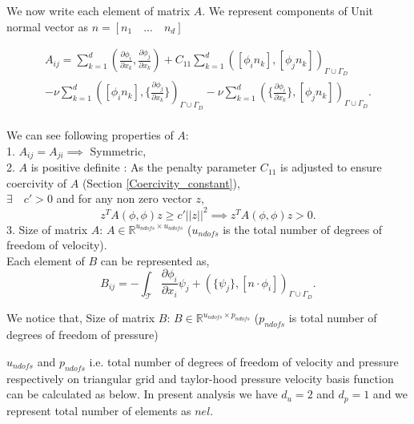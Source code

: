 \documentclass[a4paper,twoside,openright]{book}
\begin{document}
We now write each element of matrix $A$. We represent components of Unit normal vector as $n = [n_1 \quad ... \quad n_d]$

\begin{equation} \label{matrix A}
\begin{split}
A_{ij} = \sum_{k=1}^d (\frac{\partial \phi_i}{\partial x_k} , \frac{\partial \phi_j}{\partial x_k}) + C_{11} \sum_{k=1}^d ([\phi_i n_k] , [\phi_j n_k])_{\Gamma \cup \Gamma_D} \\ - \nu \sum_{k=1}^d ([\phi_i n_k] , \lbrace \frac{\partial \phi_j}{\partial x_k} \rbrace)_{\Gamma \cup \Gamma_D} - \nu \sum_{k=1}^d (\lbrace \frac{\partial \phi_i}{\partial x_k} \rbrace , [\phi_j n_k])_{\Gamma \cup \Gamma_D} \textrm{.}
\end{split}
\end{equation}
${}$\\
We can see following properties of $A$: 
\\
1. $A_{ij} = A_{ji} \implies$ Symmetric,\\
2. $A$ is positive definite : As the penalty parameter $C_{11}$ is adjusted to ensure coercivity of $A$ (Section \ref{Coercivity_constant}),\\
$\exists \quad c' > 0 $ and for any non zero vector $z$,
\begin{equation}
z^T A( \phi , \phi ) z \geq c' || z ||^2 \implies z^T A( \phi , \phi ) z > 0 \textrm{.}
\end{equation}
3. Size of matrix $A$: $A \in \mathbb{R}^{u_{ndofs} \times u_{ndofs}}$ ($u_{ndofs}$ is the total number of degrees of freedom of velocity).\\

Each element of $B$ can be represented as,\\
\begin{equation} \label{matrix B}
B_{ij} = - \int_\mathcal{T} \frac{\partial \phi_i}{\partial x_i} \psi_j + (\lbrace \psi_j \rbrace , [n \cdot \phi_i])_{\Gamma \cup \Gamma_D} \textrm{.}
\end{equation}

We notice that, Size of matrix $B$: $B \in \mathbb{R}^{u_{ndofs} \times p_{ndofs}}$ ($p_{ndofs}$ is total number of degrees of freedom of pressure)

$u_{ndofs}$ and $p_{ndofs}$ i.e. total number of degrees of freedom of velocity and pressure respectively on triangular grid and taylor-hood pressure velocity basis function can be calculated as below. In present analysis we have $d_u = 2$ and $d_p = 1$ and we represent total number of elements as $nel$.
\end{document}
